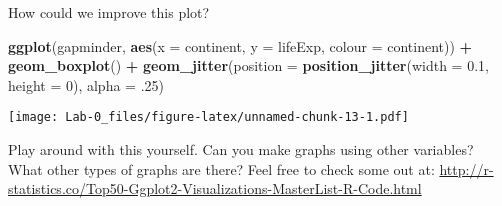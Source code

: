 \documentclass[
]{article}
\newenvironment{Shaded}{\begin{snugshade}}{\end{snugshade}}
\newcommand{\AttributeTok}[1]{\textcolor[rgb]{0.13,0.29,0.53}{#1}}
\newcommand{\DecValTok}[1]{\textcolor[rgb]{0.00,0.00,0.81}{#1}}
\newcommand{\FloatTok}[1]{\textcolor[rgb]{0.00,0.00,0.81}{#1}}
\newcommand{\FunctionTok}[1]{\textcolor[rgb]{0.13,0.29,0.53}{\textbf{#1}}}
\newcommand{\NormalTok}[1]{#1}
\newcommand{\SpecialCharTok}[1]{\textcolor[rgb]{0.81,0.36,0.00}{\textbf{#1}}}
\begin{document}
How could we improve this plot?

\begin{Shaded}
\begin{Highlighting}[]
\FunctionTok{ggplot}\NormalTok{(gapminder, }\FunctionTok{aes}\NormalTok{(}\AttributeTok{x =}\NormalTok{ continent, }\AttributeTok{y =}\NormalTok{ lifeExp, }\AttributeTok{colour =}\NormalTok{ continent)) }\SpecialCharTok{+}
  \FunctionTok{geom\_boxplot}\NormalTok{() }\SpecialCharTok{+}
  \FunctionTok{geom\_jitter}\NormalTok{(}\AttributeTok{position =} \FunctionTok{position\_jitter}\NormalTok{(}\AttributeTok{width =} \FloatTok{0.1}\NormalTok{, }\AttributeTok{height =} \DecValTok{0}\NormalTok{), }\AttributeTok{alpha =}\NormalTok{ .}\DecValTok{25}\NormalTok{)}
\end{Highlighting}
\end{Shaded}

\texttt{[image: Lab-0\_files/figure-latex/unnamed-chunk-13-1.pdf]}

Play around with this yourself. Can you make graphs using other
variables? What other types of graphs are there? Feel free to check some
out at:
\url{http://r-statistics.co/Top50-Ggplot2-Visualizations-MasterList-R-Code.html}
\end{document}
